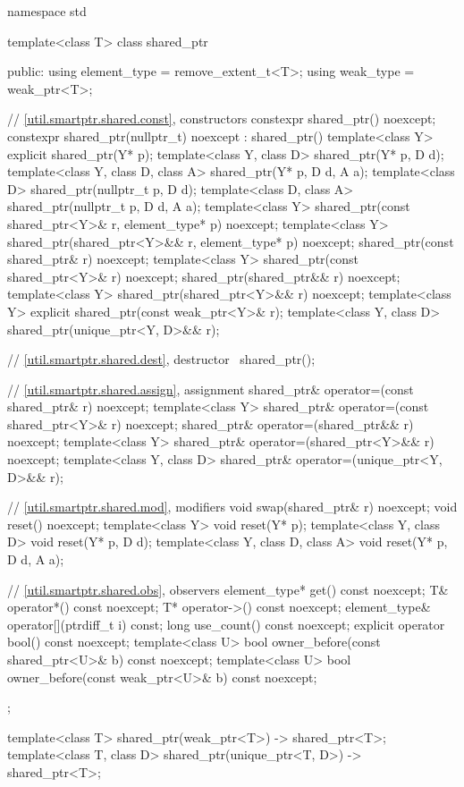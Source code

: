 \begin{codeblock}
namespace std {
  template<class T> class shared_ptr {
  public:
    using element_type = remove_extent_t<T>;
    using weak_type    = weak_ptr<T>;

    // \ref{util.smartptr.shared.const}, constructors
    constexpr shared_ptr() noexcept;
    constexpr shared_ptr(nullptr_t) noexcept : shared_ptr() { }
    template<class Y>
      explicit shared_ptr(Y* p);
    template<class Y, class D>
      shared_ptr(Y* p, D d);
    template<class Y, class D, class A>
      shared_ptr(Y* p, D d, A a);
    template<class D>
      shared_ptr(nullptr_t p, D d);
    template<class D, class A>
      shared_ptr(nullptr_t p, D d, A a);
    template<class Y>
      shared_ptr(const shared_ptr<Y>& r, element_type* p) noexcept;
    template<class Y>
      shared_ptr(shared_ptr<Y>&& r, element_type* p) noexcept;
    shared_ptr(const shared_ptr& r) noexcept;
    template<class Y>
      shared_ptr(const shared_ptr<Y>& r) noexcept;
    shared_ptr(shared_ptr&& r) noexcept;
    template<class Y>
      shared_ptr(shared_ptr<Y>&& r) noexcept;
    template<class Y>
      explicit shared_ptr(const weak_ptr<Y>& r);
    template<class Y, class D>
      shared_ptr(unique_ptr<Y, D>&& r);

    // \ref{util.smartptr.shared.dest}, destructor
    ~shared_ptr();

    // \ref{util.smartptr.shared.assign}, assignment
    shared_ptr& operator=(const shared_ptr& r) noexcept;
    template<class Y>
      shared_ptr& operator=(const shared_ptr<Y>& r) noexcept;
    shared_ptr& operator=(shared_ptr&& r) noexcept;
    template<class Y>
      shared_ptr& operator=(shared_ptr<Y>&& r) noexcept;
    template<class Y, class D>
      shared_ptr& operator=(unique_ptr<Y, D>&& r);

    // \ref{util.smartptr.shared.mod}, modifiers
    void swap(shared_ptr& r) noexcept;
    void reset() noexcept;
    template<class Y>
      void reset(Y* p);
    template<class Y, class D>
      void reset(Y* p, D d);
    template<class Y, class D, class A>
      void reset(Y* p, D d, A a);

    // \ref{util.smartptr.shared.obs}, observers
    element_type* get() const noexcept;
    T& operator*() const noexcept;
    T* operator->() const noexcept;
    element_type& operator[](ptrdiff_t i) const;
    long use_count() const noexcept;
    explicit operator bool() const noexcept;
    template<class U>
      bool owner_before(const shared_ptr<U>& b) const noexcept;
    template<class U>
      bool owner_before(const weak_ptr<U>& b) const noexcept;
  };

  template<class T>
    shared_ptr(weak_ptr<T>) -> shared_ptr<T>;
  template<class T, class D>
    shared_ptr(unique_ptr<T, D>) -> shared_ptr<T>;
}
\end{codeblock}

